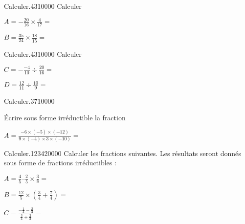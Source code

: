 
\begin{pageParcoursu} %




\begin{minipage}{0.5\linewidth}
\begin{ExoCuN}{Calculer.}{43}{1}{0}{0}{0}{0}
Calculer \vspace{0.4cm}

$A=-\frac{20}{16} \times \frac{4}{17}=$

$B=\frac{35}{24} \times \frac{18}{15}=$
\end{ExoCuN}
\end{minipage}
\begin{minipage}{0.5\linewidth}
\begin{ExoCuN}{Calculer.}{43}{1}{0}{0}{0}{0}
Calculer \vspace{0.4cm}

$C=-\frac{-4}{10} \div \frac{20}{16}=$

$D=\frac{12}{11} \div \frac{10}{9}=$


\end{ExoCuN}
\end{minipage}


\begin{ExoCuN}{Calculer.}{37}{1}{0}{0}{0}{0}

Écrire sous forme irréductible la fraction 

$A=\frac{-6 \times ( -5) \times (-12)}{9 \times ( -4) \times 3 \times (-10)}=$

\end{ExoCuN}



\begin{ExoCu}{Calculer.}{1234}{2}{0}{0}{0}{0}
Calculer les fractions suivantes. Les résultats seront donnés sous forme de fractions irréductibles : \vspace{0.4cm}

$A=\frac{4}{5} – \frac{2}{5} \times \frac{3}{8}=$ 

$B = \frac{12}{5} \times \left(\frac{3}{4} + \frac{7}{4} \right)=$ 

$C = \frac{-\frac{1}{4} -\frac{2}{3}}{\frac{3}{4}+\frac{2}{3}}=$ 
\end{ExoCu}



\end{pageParcoursu}

